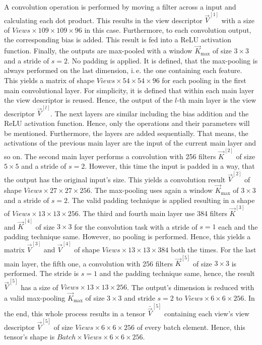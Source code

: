 A convolution operation is performed by moving a filter across a input and calculating each dot product.
This results in the view descriptor $\vec{V}^{[1]}$ with a size of $Views \times 109 \times 109 \times 96$ in this case.
Furthermore, to each convolution output, the corresponding bias is added.
This result is fed into a ReLU activation function.
Finally, the outputs are max-pooled with a window $\vec{K}_{\text{max}}$ of size $3 \times 3$ and a stride of $s=2$.
No padding is applied.
It is defined, that the max-pooling is always performed on the last dimension, i.\,e. the one containing each feature.
This yields a matrix of shape $Views \times 54 \times 54 \times 96$ for each pooling in the first main convolutional layer.
For simplicity, it is defined that within each main layer the view descriptor is reused.
Hence, the output of the $l$-th main layer is the view descriptor $\vec{V}^{[l]}$.
The next layers are similar including the bias addition and the ReLU activation function.
Hence, only the operations and their parameters will be mentioned.
Furthermore, the layers are added sequentially.
That means, the activations of the previous main layer are the input of the current main layer and so on.
The second main layer performs a convolution with 256 filters $\vec{K}^{[2]}$ of size $5 \times 5$ and a stride of $s=2$.
However, this time the input is padded in a way, that the output has the original input's size.
This yields a convolution result $\vec{V}^{[2]}$ of shape $Views \times 27 \times 27 \times 256$.
The max-pooling uses again a window $\vec{K}_{\text{max}}$ of $3 \times 3$ and a stride of $s=2$.
The valid padding technique is applied resulting in a shape of $Views \times 13 \times 13 \times 256$.
The third and fourth main layer use 384 filters $\vec{K}^{[3]}$ and $\vec{K}^{[4]}$ of size $3 \times 3$ for the convolution task with a stride of $s=1$ each and the padding technique same.
However, no pooling is performed.
Hence, this yields a matrix $\vec{V}^{[3]}$ and $\vec{V}^{[4]}$ of shape $Views \times 13 \times 13 \times 384$ both the times.
For the last main layer, the fifth one, a convolution with 256 filters $\vec{K}^{[5]}$ of size $3 \times 3$ is performed.
The stride is $s=1$ and the padding technique same, hence, the result $\vec{V}^{[5]}$ has a size of $Views \times 13 \times 13 \times 256$.
The output's dimension is reduced with a valid max-pooling $\vec{K}_{\text{max}}$ of size $3 \times 3$ and stride $s=2$ to $Views \times 6 \times 6 \times 256$.
In the end, this whole process results in a tensor $\bar{\vec{V}}^{[5]}$ containing each view's view descriptor $\vec{V}^{[5]}$ of size $Views \times 6 \times 6 \times 256$ of every batch element.
Hence, this tensor's shape is $Batch \times Views \times 6 \times 6 \times 256$.